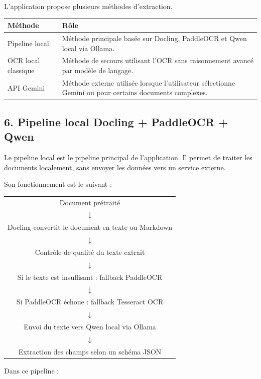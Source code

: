 \documentclass[12pt,a4paper]{report}
\begin{document}
L'application propose plusieurs méthodes d'extraction.

\begin{longtable}{|p{4cm}|p{10cm}|}
\hline
\textbf{Méthode} & \textbf{Rôle} \\
\hline
Pipeline local & Méthode principale basée sur Docling, PaddleOCR et Qwen local via Ollama. \\
\hline
OCR local classique & Méthode de secours utilisant l'OCR sans raisonnement avancé par modèle de langage. \\
\hline
API Gemini & Méthode externe utilisée lorsque l'utilisateur sélectionne Gemini ou pour certains documents complexes. \\
\hline
\end{longtable}

\subsection*{6. Pipeline local Docling + PaddleOCR + Qwen}

Le pipeline local est le pipeline principal de l'application. Il permet de traiter les documents localement, sans envoyer les données vers un service externe.

Son fonctionnement est le suivant :

\begin{center}
\begin{tabular}{c}
Document prétraité \\
$\downarrow$ \\
Docling convertit le document en texte ou Markdown \\
$\downarrow$ \\
Contrôle de qualité du texte extrait \\
$\downarrow$ \\
Si le texte est insuffisant : fallback PaddleOCR \\
$\downarrow$ \\
Si PaddleOCR échoue : fallback Tesseract OCR \\
$\downarrow$ \\
Envoi du texte vers Qwen local via Ollama \\
$\downarrow$ \\
Extraction des champs selon un schéma JSON \\
\end{tabular}
\end{center}

Dans ce pipeline :
\end{document}
